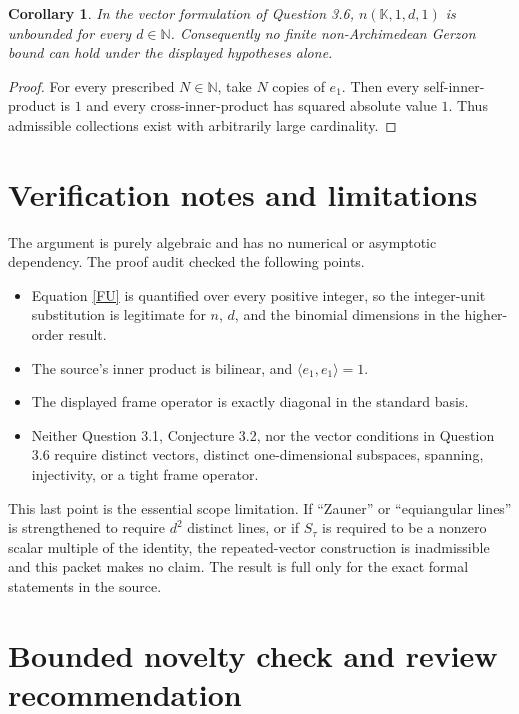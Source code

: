 \documentclass[11pt]{article}
\newtheorem{corollary}{Corollary}
\newcommand{\K}{\mathbb K}
\newcommand{\N}{\mathbb N}
\begin{document}
\begin{corollary}\label{gerzon}
In the vector formulation of Question 3.6,
$n(\K,1,d,1)$ is unbounded for every $d\in\N$.  Consequently no finite
non-Archimedean Gerzon bound can hold under the displayed hypotheses alone.
\end{corollary}

\begin{proof}
For every prescribed $N\in\N$, take $N$ copies of $e_1$.  Then every
self-inner-product is $1$ and every cross-inner-product has squared absolute
value $1$.  Thus admissible collections exist with arbitrarily large
cardinality.
\end{proof}

\section{Verification notes and limitations}

The argument is purely algebraic and has no numerical or asymptotic
dependency.  The proof audit checked the following points.
\begin{itemize}
 \item Equation \eqref{FU} is quantified over every positive integer, so the
 integer-unit substitution is legitimate for $n$, $d$, and the binomial
 dimensions in the higher-order result.
 \item The source's inner product is bilinear, and $\langle e_1,e_1\rangle=1$.
 \item The displayed frame operator is exactly diagonal in the standard basis.
 \item Neither Question 3.1, Conjecture 3.2, nor the vector conditions in
 Question 3.6 require distinct vectors, distinct one-dimensional subspaces,
 spanning, injectivity, or a tight frame operator.
\end{itemize}

This last point is the essential scope limitation.  If ``Zauner'' or
``equiangular lines'' is strengthened to require $d^2$ distinct lines, or if
$S_\tau$ is required to be a nonzero scalar multiple of the identity, the
repeated-vector construction is inadmissible and this packet makes no claim.
The result is full only for the exact formal statements in the source.

\section{Bounded novelty check and review recommendation}
\end{document}
